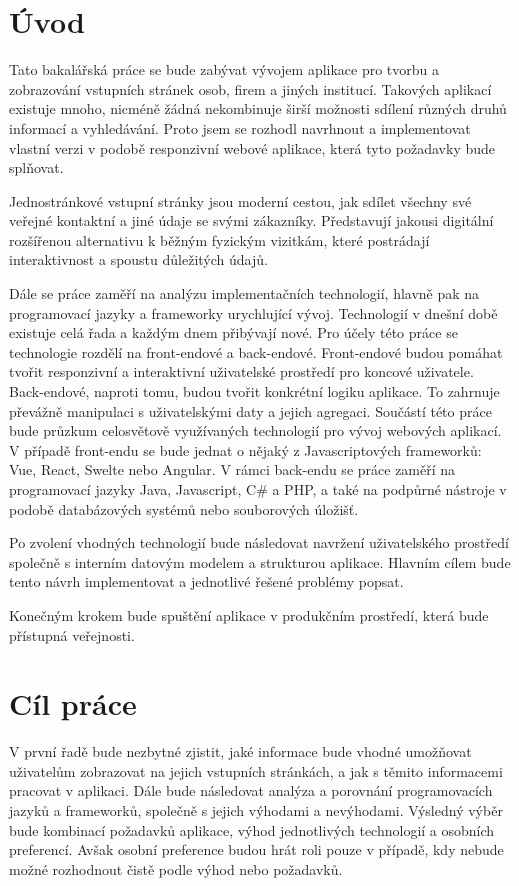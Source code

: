 \section{Úvod}

Tato bakalářská práce se bude zabývat vývojem aplikace pro tvorbu a zobrazování vstupních stránek osob, firem a jiných
institucí.
Takových aplikací existuje mnoho, nicméně žádná nekombinuje širší možnosti sdílení různých druhů informací a vyhledávání.
Proto jsem se rozhodl navrhnout a implementovat vlastní verzi v podobě responzivní webové aplikace, která
tyto požadavky bude splňovat.

Jednostránkové vstupní stránky jsou moderní cestou, jak sdílet všechny své veřejné kontaktní a jiné údaje se
svými zákazníky.
Představují jakousi digitální rozšířenou alternativu k běžným fyzickým vizitkám, které postrádají interaktivnost
a spoustu důležitých údajů.

Dále se práce zaměří na analýzu implementačních technologií, hlavně pak na programovací jazyky a frameworky urychlující vývoj.
Technologií v dnešní době existuje celá řada a každým dnem přibývají nové.
Pro účely této práce se technologie rozdělí na front-endové a back-endové.
Front-endové budou pomáhat tvořit responzivní a interaktivní uživatelské prostředí pro koncové uživatele.
Back-endové, naproti tomu, budou tvořit konkrétní logiku aplikace.
To zahrnuje převážně manipulaci s uživatelskými daty a jejich agregaci.
Součástí této práce bude průzkum celosvětově využívaných technologií pro vývoj webových aplikací.
V případě front-endu se bude jednat o nějaký z Javascriptových frameworků: Vue, React, Swelte nebo Angular.
V rámci back-endu se práce zaměří na programovací jazyky Java, Javascript, C\# a PHP, a také na
podpůrné nástroje v podobě databázových systémů nebo souborových úložišť.

Po zvolení vhodných technologií bude následovat navržení uživatelského prostředí společně s interním
datovým modelem a strukturou aplikace.
Hlavním cílem bude tento návrh implementovat a jednotlivé řešené problémy popsat.

Konečným krokem bude spuštění aplikace v produkčním prostředí, která bude přístupná veřejnosti.

\section{Cíl práce}

V první řadě bude nezbytné zjistit, jaké informace bude vhodné umožňovat uživatelům zobrazovat na jejich
vstupních stránkách, a jak s těmito informacemi pracovat v aplikaci.
Dále bude následovat analýza a porovnání programovacích jazyků a frameworků, společně s jejich výhodami a nevýhodami.
Výsledný výběr bude kombinací požadavků aplikace, výhod jednotlivých technologií a osobních preferencí.
Avšak osobní preference budou hrát roli pouze v případě, kdy nebude možné rozhodnout čistě podle výhod nebo požadavků.

